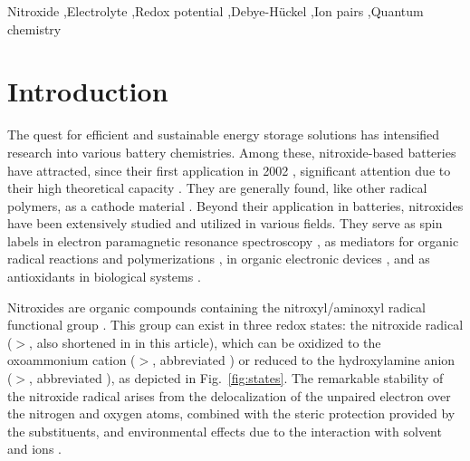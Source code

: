 \documentclass[review,preprint]{elsarticle}
\begin{document}
\begin{frontmatter}
		\begin{keyword}
			Nitroxide 
			\sep Electrolyte 
			\sep Redox potential
			\sep Debye-Hückel 
			\sep Ion pairs 
			\sep Quantum chemistry
			
			
			
		\end{keyword}
		
	\end{frontmatter}
	
	
\section{Introduction}


The quest for efficient and sustainable energy storage solutions has intensified research into various battery chemistries. Among these, nitroxide-based batteries have attracted, since their first application in 2002 \cite{nakaharaRechargeableBatteriesOrganic2002}, significant attention due to their high theoretical capacity \cite{friebeSustainableEnergyStorage2019,ernouldNitroxidesBatteryrelatedApplications2021,keDesigningStrategiesAdvanced2023}. They are generally found, like other radical polymers, as a cathode material \cite{okaRadicalPolymersRechargeable2020a,assummaNewConductingCopolymer2020}. Beyond their application in batteries, nitroxides have been extensively studied and utilized in various fields. They serve as spin labels in electron paramagnetic resonance spectroscopy \cite{torricellaNitroxideSpinLabels2021}, as mediators for organic radical reactions and polymerizations \cite{tebbenNitroxidesApplicationsSynthesis2011,leifertOrganicSynthesisUsing2023}, in organic electronic devices \cite{jiAirStableOrganicRadicals2020,xieNitroxideRadicalPolymers2021}, and as antioxidants in biological systems  \cite{souleChemistryBiologyNitroxide2007,lewandowskiNitroxidesAntioxidantsAnticancer2017,prescottBiologicalRelevanceFree2017}.

Nitroxides are organic compounds containing the nitroxyl/aminoxyl radical functional group \cite{berlinerHistoryUseNitroxides2012}. This group can exist in three redox states: the nitroxide radical ($>$, also shortened in  in this article), which can be oxidized to the oxoammonium cation ($>$, abbreviated ) or reduced to the hydroxylamine anion ($>$, abbreviated ), as depicted in Fig.~\ref{fig:states}. The remarkable stability of the nitroxide radical arises from the delocalization of the unpaired electron over the nitrogen and oxygen atoms, combined with the steric protection provided by the substituents, and environmental effects due to the interaction with solvent and ions \cite{grynovaOriginScopeLongRange2013,grynovaSwitchingRadicalStability2013}. 
\end{document}
